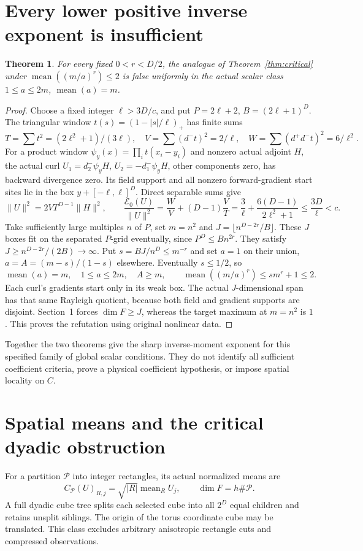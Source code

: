 \documentclass[11pt]{article}
\newtheorem{theorem}{Theorem}
\newcommand{\E}{\mathcal E}
\begin{document}
\section{Every lower positive inverse exponent is insufficient}
\begin{theorem}\label{thm:subcritical}
For every fixed $0<r<D/2$, the analogue of Theorem~\ref{thm:critical} under
$\operatorname{mean}((m/a)^r)\leq2$ is false uniformly in the actual scalar class
$1\leq a\leq2m$, $\operatorname{mean}(a)=m$.
\end{theorem}
\begin{proof}
Choose a fixed integer $\ell>3D/c$, and put $P=2\ell+2$, $B=(2\ell+1)^D$.
The triangular window $t(s)=(1-|s|/\ell)_+$ has finite sums
\[
 T=\sum t^2=(2\ell^2+1)/(3\ell),\quad
 V=\sum(d^-t)^2=2/\ell,\quad W=\sum(d^+d^-t)^2=6/\ell^2.
\]
For a product window $\psi_y(x)=\prod_it(x_i-y_i)$ and nonzero actual adjoint $H$,
the actual curl $U_1=d^-_2\psi_y H$, $U_2=-d^-_1\psi_y H$, other components zero,
has backward divergence zero. Its field support and all nonzero forward-gradient
start sites lie in the box $y+[-\ell,\ell]^D$. Direct separable sums give
\[
 \|U\|^2=2VT^{D-1}\|H\|^2,\qquad
 \frac{\E_0(U)}{\|U\|^2}=\frac WV+(D-1)\frac VT
 =\frac3\ell+\frac{6(D-1)}{2\ell^2+1}\leq\frac{3D}\ell<c.
\]
Take sufficiently large multiples $n$ of $P$, set $m=n^2$ and
$J=\lfloor n^{D-2r}/B\rfloor$. These $J$ boxes fit on the separated $P$-grid
eventually, since $P^D\leq Bn^{2r}$. They satisfy
$J\geq n^{D-2r}/(2B)\to\infty$. Put $s=BJ/n^D\leq m^{-r}$ and set $a=1$ on
their union, $a=A=(m-s)/(1-s)$ elsewhere. Eventually $s\leq1/2$, so
\[
 \operatorname{mean}(a)=m,\quad1\leq a\leq2m,\quad A\geq m,
 \qquad\operatorname{mean}((m/a)^r)\leq sm^r+1\leq2.
\]
Each curl's gradients start only in its weak box. The actual $J$-dimensional span
has that same Rayleigh quotient, because both field and gradient supports are
disjoint. Section~1 forces $\dim F\geq J$, whereas the target maximum at $m=n^2$
is $1$. This proves the refutation using original nonlinear data.
\end{proof}
Together the two theorems give the sharp inverse-moment exponent for this specified
family of global scalar conditions. They do not identify all sufficient coefficient
criteria, prove a physical coefficient hypothesis, or impose spatial locality on $C$.

\section{Spatial means and the critical dyadic obstruction}
For a partition $\mathcal P$ into integer rectangles, its actual normalized means are
\[
 C_{\mathcal P}(U)_{R,j}=\sqrt{|R|}\operatorname{mean}_R U_j,
 \qquad \dim F=h\#\mathcal P.
\]
A full dyadic cube tree splits each selected cube into all $2^D$ equal children and
retains unsplit siblings. The origin of the torus coordinate cube may be translated.
This class excludes arbitrary anisotropic rectangle cuts and compressed observations.
\end{document}
